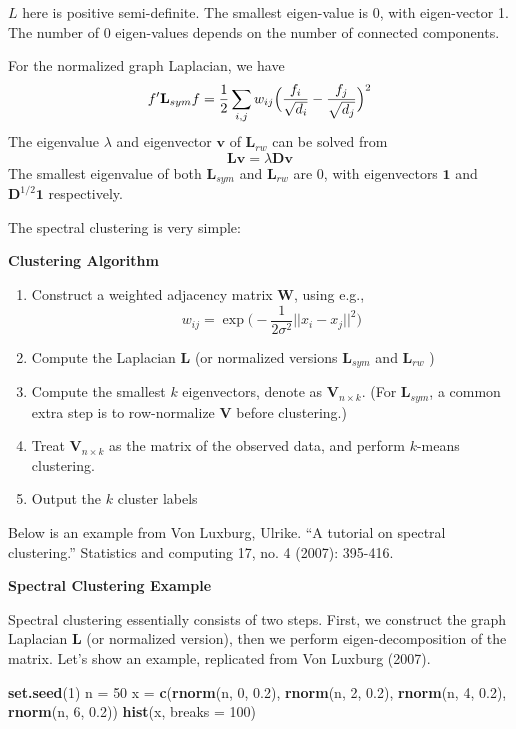 \documentclass[
]{book}
\newenvironment{Shaded}{\begin{snugshade}}{\end{snugshade}}
\newcommand{\AttributeTok}[1]{\textcolor[rgb]{0.13,0.29,0.53}{#1}}
\newcommand{\DecValTok}[1]{\textcolor[rgb]{0.00,0.00,0.81}{#1}}
\newcommand{\FloatTok}[1]{\textcolor[rgb]{0.00,0.00,0.81}{#1}}
\newcommand{\FunctionTok}[1]{\textcolor[rgb]{0.13,0.29,0.53}{\textbf{#1}}}
\newcommand{\NormalTok}[1]{#1}
\newcommand{\OtherTok}[1]{\textcolor[rgb]{0.56,0.35,0.01}{#1}}
\begin{document}
\(L\) here is positive semi-definite. The smallest eigen-value is 0, with eigen-vector 1. The number of 0 eigen-values depends on the number of connected components.

For the normalized graph Laplacian, we have
\[f' \mathbf{L}_{sym} f = \frac{1}{2} \sum_{i,j} w_{ij} \Bigl( \frac{f_i}{\sqrt{d_i}} - \frac{f_j}{\sqrt{d_j}} \Bigr)^2\]
The eigenvalue \(\lambda\) and eigenvector \(\mathbf{v}\) of \(\mathbf{L}_{rw}\) can be solved from
\[\mathbf{L}\mathbf{v} = \lambda \mathbf{D}\mathbf{v}\]
The smallest eigenvalue of both \(\mathbf{L}_{sym}\) and \(\mathbf{L}_{rw}\) are 0, with eigenvectors \(\mathbf{1}\) and \(\mathbf{D}^{1/2}\mathbf{1}\) respectively.

The spectral clustering is very simple:

\textbf{Clustering Algorithm}

\begin{enumerate}
\def\labelenumi{\arabic{enumi}.}
\item
  Construct a weighted adjacency matrix \(\mathbf{W}\), using e.g.,
  \[w_{ij} = \exp \Biggl( -\frac{1}{2\sigma^2} ||x_i - x_j||^2\Biggr)\]
\item
  Compute the Laplacian \(\mathbf{L}\) (or normalized versions \(\mathbf{L}_{sym}\) and \(\mathbf{L}_{rw}\) )
\item
  Compute the smallest \(k\) eigenvectors, denote as \(\mathbf{V}_{n \times k}\). (For \(\mathbf{L}_{sym}\), a common extra step is to row-normalize \(\mathbf{V}\) before clustering.)
\item
  Treat \(\mathbf{V}_{n \times k}\) as the matrix of the observed data, and perform \(k\)-means clustering.
\item
  Output the \(k\) cluster labels
\end{enumerate}

Below is an example from Von Luxburg, Ulrike. ``A tutorial on spectral clustering.'' Statistics and computing 17, no. 4 (2007): 395-416.

\textbf{Spectral Clustering Example}

Spectral clustering essentially consists of two steps. First, we construct the graph Laplacian \(\mathbf{L}\) (or normalized version), then we perform eigen-decomposition of the matrix. Let's show an example, replicated from Von Luxburg (2007).

\begin{Shaded}
\begin{Highlighting}[]
\FunctionTok{set.seed}\NormalTok{(}\DecValTok{1}\NormalTok{)}
\NormalTok{n }\OtherTok{=} \DecValTok{50}
\NormalTok{x }\OtherTok{=} \FunctionTok{c}\NormalTok{(}\FunctionTok{rnorm}\NormalTok{(n, }\DecValTok{0}\NormalTok{, }\FloatTok{0.2}\NormalTok{), }\FunctionTok{rnorm}\NormalTok{(n, }\DecValTok{2}\NormalTok{, }\FloatTok{0.2}\NormalTok{), }\FunctionTok{rnorm}\NormalTok{(n, }\DecValTok{4}\NormalTok{, }\FloatTok{0.2}\NormalTok{), }\FunctionTok{rnorm}\NormalTok{(n,}
    \DecValTok{6}\NormalTok{, }\FloatTok{0.2}\NormalTok{))}
\FunctionTok{hist}\NormalTok{(x, }\AttributeTok{breaks =} \DecValTok{100}\NormalTok{)}
\end{Highlighting}
\end{Shaded}
\end{document}
